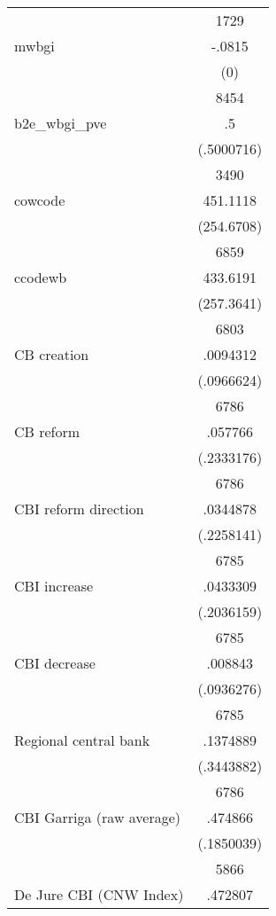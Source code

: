 {\begin{longtable}{l*{1}{c}}
                    &        1729\\
mwbgi               &      -.0815\\
                    &         (0)\\
                    &        8454\\
b2e\_wbgi\_pve        &          .5\\
                    &  (.5000716)\\
                    &        3490\\
cowcode             &    451.1118\\
                    &  (254.6708)\\
                    &        6859\\
ccodewb             &    433.6191\\
                    &  (257.3641)\\
                    &        6803\\
CB creation         &    .0094312\\
                    &  (.0966624)\\
                    &        6786\\
CB reform           &     .057766\\
                    &  (.2333176)\\
                    &        6786\\
CBI  reform direction&    .0344878\\
                    &  (.2258141)\\
                    &        6785\\
CBI increase        &    .0433309\\
                    &  (.2036159)\\
                    &        6785\\
CBI decrease        &     .008843\\
                    &  (.0936276)\\
                    &        6785\\
Regional central bank&    .1374889\\
                    &  (.3443882)\\
                    &        6786\\
CBI Garriga (raw average)&     .474866\\
                    &  (.1850039)\\
                    &        5866\\
De Jure CBI (CNW Index)&     .472807\\

\end{longtable}}
